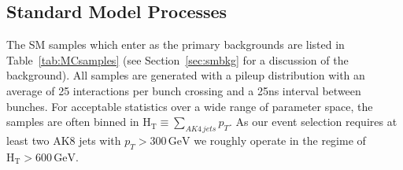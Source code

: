 \subsection{Standard Model Processes}
\label{sec:smp}

The SM samples which enter as the primary backgrounds are listed in Table~\ref{tab:MCsamples} (see Section~\ref{sec:smbkg} for a discussion of the background). All samples are generated with a pileup distribution with an average of 25 interactions per bunch crossing and a 25ns interval between bunches. For acceptable statistics over a wide range of parameter space, the  samples are often binned in $\mathrm{H_{T}} \equiv \sum_{AK4\,jets}p_{T}$. As our event selection requires at least two AK8 jets with $p_{T}>300\,\textrm{GeV}$ we roughly operate in the regime of $\mathrm{H_{T}}>600\,\textrm{GeV}$.

